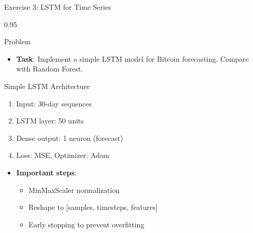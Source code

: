 \documentclass[9pt, aspectratio=169, t]{beamer}
\begin{document}
\begin{frame}{Exercise 3: LSTM for Time Series}
    \begin{cminipage}{0.95\textwidth}
    \begin{alertblock}{Problem}
        \begin{itemize}\setlength{\itemsep}{0pt}
            \item \textbf{Task}: Implement a simple LSTM model for Bitcoin forecasting. Compare with Random Forest.
        \end{itemize}
    \end{alertblock}

    \vspace{0.2cm}
    \begin{exampleblock}{Simple LSTM Architecture}
        \begin{enumerate}\setlength{\itemsep}{0pt}
            \item Input: 30-day sequences
            \item LSTM layer: 50 units
            \item Dense output: 1 neuron (forecast)
            \item Loss: MSE, Optimizer: Adam
        \end{enumerate}

        \begin{itemize}\setlength{\itemsep}{0pt}
            \item \textbf{Important steps}:
            \begin{itemize}\setlength{\itemsep}{0pt}
                \item MinMaxScaler normalization
                \item Reshape to [samples, timesteps, features]
                \item Early stopping to prevent overfitting
            \end{itemize}
        \end{itemize}
    \end{exampleblock}
    \end{cminipage}
\end{frame}
\end{document}
